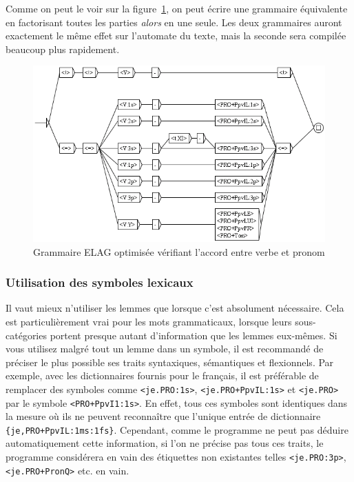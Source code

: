 \bigskip
\noindent Comme on peut le voir sur la figure~\ref{fig-NA-good}, on peut écrire une grammaire
équivalente en factorisant toutes les parties \textit{alors} en une seule. Les deux grammaires auront exactement le même effet sur l’automate du texte, mais la seconde sera compilée beaucoup plus rapidement.


\begin{figure}[!ht]
\begin{center}
\includegraphics[width=15cm]{resources/img/fig7-22.png}
\caption{Grammaire ELAG optimisée vérifiant l’accord entre verbe et pronom\label{fig-NA-good}}
\end{center}
\end{figure}


\subsubsection{Utilisation des symboles lexicaux}
\noindent Il vaut mieux n’utiliser les lemmes que lorsque c’est absolument nécessaire. Cela est
particulièrement vrai pour les mots grammaticaux, lorsque leurs sous-catégories portent
presque autant d’information que les lemmes eux-mêmes. Si vous utilisez malgré tout un
lemme dans un symbole, il est recommandé de préciser le plus possible ses traits syntaxiques, 
sémantiques et flexionnels.
Par exemple, avec les dictionnaires fournis pour le français, il est préférable de remplacer des 
symboles comme \verb$<je.PRO:1s>$, \verb$<je.PRO+PpvIL:1s>$ et \verb$<je.PRO>$
par le symbole \verb$<PRO+PpvI1:1s>$. En effet, tous ces symboles sont identiques dans la 
mesure où ils ne peuvent reconnaître que l’unique entrée de dictionnaire 
\verb${je,PRO+PpvIL:1ms:1fs}$. Cependant, comme le programme ne peut pas déduire automatiquement
cette information, si l’on ne précise pas tous ces traits, le programme considérera en vain des 
étiquettes non existantes telles \verb$<je.PRO:3p>$, \verb$<je.PRO+PronQ>$ etc. en vain.



